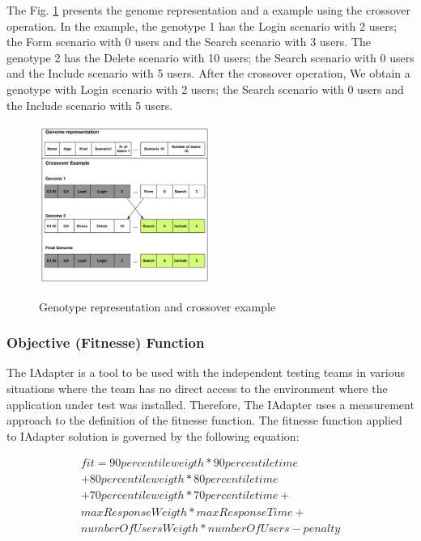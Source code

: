 The Fig. \ref{fig:genomarepresentation} presents the genome representation and  a example using the crossover operation. In the example, the genotype 1 has the Login scenario with 2 users; the Form scenario with 0 users and the Search scenario with 3 users. The genotype 2 has the Delete scenario with 10 users; the Search scenario with 0 users and the Include scenario with 5 users. After the crossover operation, We obtain a genotype with  Login scenario with 2 users; the Search scenario with 0 users and the Include scenario with 5 users.

\begin{figure}[h]
\caption{Genotype representation and crossover example}
\includegraphics[width=0.5\textwidth]{./images/genomerepresentation.png}
\label{fig:genomarepresentation}
\end{figure}


\subsubsection{Objective (Fitnesse) Function}

The IAdapter is a tool to be used with the independent testing teams in various situations where the team has no direct access to the environment where the application under test was installed. Therefore,  The IAdapter uses a measurement approach to the definition of the fitnesse function. The fitnesse function applied to IAdapter solution is governed by the following equation:

\begin{equation}
\begin{aligned}
fit=90percentileweigth* 90percentiletime\\
+80percentileweigth*80percentiletime\\+
70percentileweigth*70percentiletime+\\
maxResponseWeigth*maxResponseTime+\\
numberOfUsersWeigth*numberOfUsers-penalty
\end{aligned}
\end{equation}

